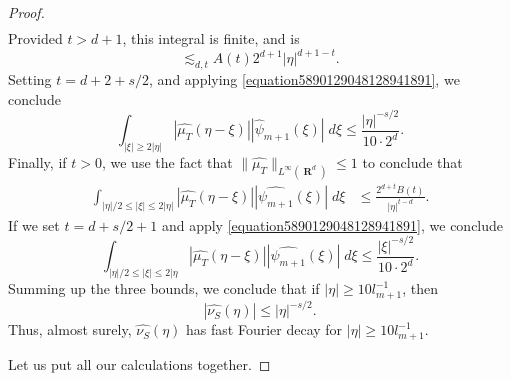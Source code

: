 \documentclass[12pt,reqno]{amsart}
\DeclareMathOperator{\RR}{\mathbf{R}}
\begin{document}
\begin{proof}
\begin{align*}
    \end{align*}
    Provided $t > d + 1$, this integral is finite, and is
    \[ \lesssim_{d,t} A(t) 2^{d + 1} |\eta|^{d + 1 - t}. \]
    Setting $t = d + 2 + s/2$, and applying \eqref{equation5890129048128941891}, we conclude
    \[ \int_{|\xi| \geq 2|\eta|} |\widehat{\mu_T}(\eta - \xi)| |\widehat{\psi}_{m+1}(\xi)|\; d\xi \leq \frac{|\eta|^{-s/2}}{10 \cdot 2^d}. \]
    Finally, if $t > 0$, we use the fact that $\| \widehat{\mu_T} \|_{L^\infty(\RR^d)} \leq 1$ to conclude that
    \begin{align*}
        \int_{|\eta|/2 \leq |\xi| \leq 2|\eta|} |\widehat{\mu_T}(\eta - \xi)| |\widehat{\psi_{m+1}}(\xi)|\; d\xi &\leq \frac{2^{d+t} B(t)}{|\eta|^{t-d}}.
    \end{align*}
    If we set $t = d + s/2 + 1$ and apply \eqref{equation5890129048128941891}, we conclude
    \[ \int_{|\eta|/2 \leq |\xi| \leq 2|\eta} |\widehat{\mu_T}(\eta - \xi)| |\widehat{\psi_{m+1}}(\xi)|\; d\xi \leq \frac{|\xi|^{-s/2}}{10 \cdot 2^d}. \]
    Summing up the three bounds, we conclude that if $|\eta| \geq 10 l_{m+1}^{-1}$, then
    \[ |\widehat{\nu_S}(\eta)| \leq |\eta|^{-s/2}. \]
    Thus, almost surely, $\widehat{\nu_S}(\eta)$ has fast Fourier decay for $|\eta| \geq 10 l_{m+1}^{-1}$.

    Let us put all our calculations together.
\end{proof}
\end{document}
